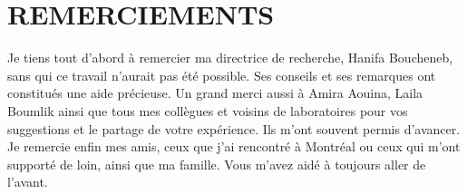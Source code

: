 %
\chapter*{REMERCIEMENTS}\thispagestyle{headings}
%
Je tiens tout d'abord à remercier ma directrice de recherche, Hanifa Boucheneb,
sans qui ce travail n'aurait pas été possible. Ses conseils et ses remarques ont
constitués une aide précieuse. Un grand merci aussi à Amira Aouina, Laila
Boumlik ainsi que tous mes collègues et voisins de laboratoires pour vos
suggestions et le partage de votre expérience. Ils m'ont souvent permis
d'avancer. Je remercie enfin mes amis, ceux que j'ai rencontré à Montréal ou
ceux qui m'ont supporté de loin, ainsi que ma famille. Vous m'avez aidé à
toujours aller de l'avant.